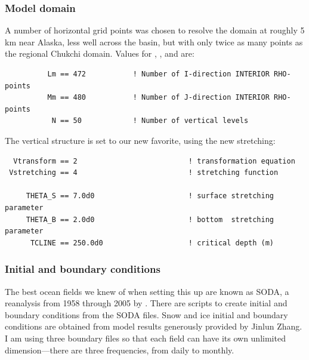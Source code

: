 \subsubsection{Model domain}
A number of horizontal grid points was chosen to resolve the
domain at roughly 5 km near Alaska, less well across the basin, but
with only twice as many points as the regional Chukchi domain. Values
for , , and  are:
\begin{verbatim}
          Lm == 472           ! Number of I-direction INTERIOR RHO-points
          Mm == 480           ! Number of J-direction INTERIOR RHO-points
           N == 50            ! Number of vertical levels
\end{verbatim}
The vertical structure is set to our new favorite, using the new stretching:
\begin{verbatim}
  Vtransform == 2                          ! transformation equation
 Vstretching == 4                          ! stretching function

     THETA_S == 7.0d0                      ! surface stretching parameter
     THETA_B == 2.0d0                      ! bottom  stretching parameter
      TCLINE == 250.0d0                    ! critical depth (m)
\end{verbatim}

\subsubsection{Initial and boundary conditions}
The best ocean fields we knew of when setting this up are known as SODA, a
reanalysis from 1958 through 2005 by
\cite{Carton_2005}. There are  scripts to create
initial and boundary conditions from the SODA files. Snow and ice
initial and boundary conditions are obtained from model results generously
provided by Jinlun Zhang. I am using three boundary files so that each
field can have its own unlimited dimension---there are three frequencies,
from daily to monthly.

